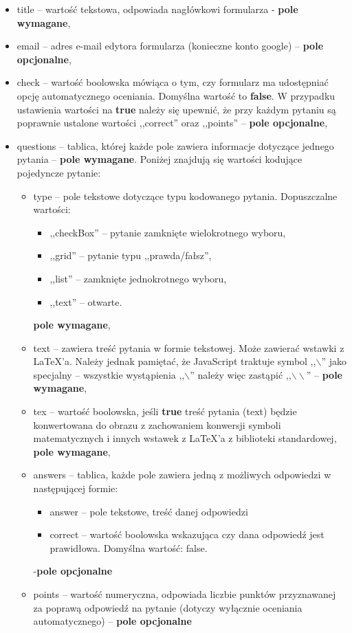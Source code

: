 \begin{itemize}
\item{title} -- wartość tekstowa, odpowiada nagłówkowi formularza -  \textbf{pole wymagane},
\item{email} -- adres e-mail edytora formularza (konieczne konto google) -- \textbf{pole opcjonalne},
\item{check} -- wartość boolowska mówiąca o tym, czy formularz ma udostępniać opcję automatycznego oceniania. Domyślna wartość to \textbf{false}. W przypadku ustawienia wartości na \textbf{true} należy się upewnić, że przy każdym pytaniu są poprawnie ustalone wartości ,,correct'' oraz ,,points'' -- \textbf{pole opcjonalne},
\item{questions} -- tablica, której każde pole zawiera informacje dotyczące jednego pytania -- \textbf{pole wymagane}. Poniżej znajdują się wartości kodujące pojedyncze pytanie:
\begin{itemize}
\item{type} -- pole tekstowe dotyczące typu kodowanego pytania. Dopuszczalne wartości:
\begin{itemize}
\item ,,checkBox'' -- pytanie zamknięte wielokrotnego wyboru,
\item ,,grid'' -- pytanie typu ,,prawda/fałsz'',
\item ,,list'' -- zamknięte jednokrotnego wyboru,
\item ,,text'' -- otwarte.
\end{itemize}
 \textbf{pole wymagane},
\item{text} -- zawiera treść pytania w formie tekstowej. Może zawierać wstawki z \LaTeX{}'a. Należy jednak pamiętać, że JavaScript traktuje symbol ,,$\backslash$'' jako specjalny -- wszystkie wystąpienia ,,$\backslash$'' należy więc zastąpić ,,$\backslash\backslash$'' -- \textbf{pole wymagane},
\item{tex} -- wartość boolowska, jeśli \textbf{true} treść pytania (text) będzie konwertowana do obrazu z zachowaniem konwersji symboli matematycznych i innych wstawek z \LaTeX{}'a z biblioteki standardowej, \textbf{pole wymagane},
\item{answers} -- tablica, każde pole zawiera jedną z możliwych odpowiedzi w następującej formie:
\begin{itemize}
\item answer -- pole tekstowe, treść danej odpowiedzi
\item correct -- wartość boolowska wskazująca czy dana odpowiedź jest prawidłowa. Domyślna wartość: false.
\end{itemize} 
-\textbf{pole opcjonalne}
\item{points} -- wartość numeryczna, odpowiada liczbie punktów przyznawanej za poprawą odpowiedź na pytanie (dotyczy wyłącznie oceniania automatycznego) -- \textbf{pole opcjonalne}
\end{itemize}
\end{itemize}









